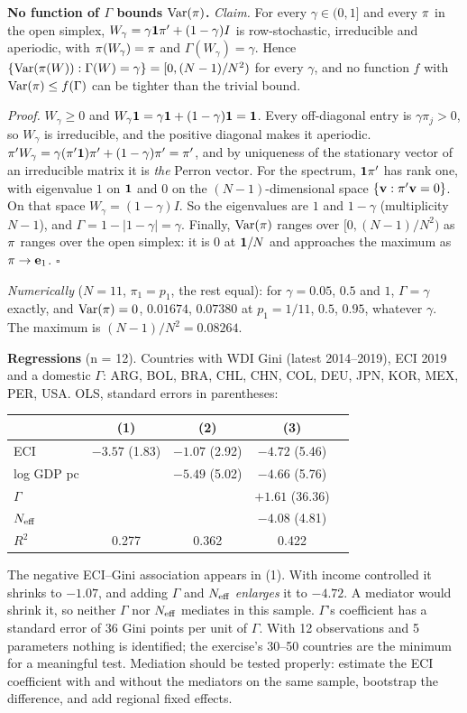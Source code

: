 \documentclass[../solutions_manual.tex]{subfiles}
\begin{document}
 \textbf{No function of $\Gamma$ bounds $\operatorname{Var}(\pi)$.} \emph{Claim.} For every $\gamma \in (0,1]$ and every $\pi$ in the open simplex, $W_\gamma = \gamma\mathbf{1}\pi' + (1-\gamma)I$ is row-stochastic, irreducible and aperiodic, with $\pi(W_\gamma) = \pi$ and $\Gamma(W_\gamma) = \gamma$. Hence $\{\operatorname{Var}(\pi(W)) : \Gamma(W) = \gamma\} = [0, (N-1)/N^2)$ for every $\gamma$, and no function $f$ with $\operatorname{Var}(\pi) \le f(\Gamma)$ can be tighter than the trivial bound.

\emph{Proof.} $W_\gamma \ge 0$ and $W_\gamma\mathbf{1} = \gamma\mathbf{1} + (1-\gamma)\mathbf{1} = \mathbf{1}$. Every off-diagonal entry is $\gamma\pi_j > 0$, so $W_\gamma$ is irreducible, and the positive diagonal makes it aperiodic. $\pi'W_\gamma = \gamma(\pi'\mathbf{1})\pi' + (1-\gamma)\pi' = \pi'$, and by uniqueness of the stationary vector of an irreducible matrix it is \emph{the} Perron vector. For the spectrum, $\mathbf{1}\pi'$ has rank one, with eigenvalue $1$ on $\mathbf{1}$ and $0$ on the $(N-1)$-dimensional space $\{\mathbf{v}: \pi'\mathbf{v} = 0\}$. On that space $W_\gamma = (1-\gamma)I$. So the eigenvalues are $1$ and $1-\gamma$ (multiplicity $N-1$), and $\Gamma = 1 - |1-\gamma| = \gamma$. Finally, $\operatorname{Var}(\pi)$ ranges over $[0, (N-1)/N^2)$ as $\pi$ ranges over the open simplex: it is $0$ at $\mathbf{1}/N$ and approaches the maximum as $\pi \to \mathbf{e}_1$. $\square$

\emph{Numerically} ($N = 11$, $\pi_1 = p_1$, the rest equal): for $\gamma = 0.05$, $0.5$ and $1$, $\Gamma = \gamma$ exactly, and $\operatorname{Var}(\pi) = 0$, $0.01674$, $0.07380$ at $p_1 = 1/11$, $0.5$, $0.95$, whatever $\gamma$. The maximum is $(N-1)/N^2 = 0.08264$.

 \textbf{Regressions} (n = 12). Countries with WDI Gini (latest 2014--2019), ECI 2019 and a domestic $\Gamma$: ARG, BOL, BRA, CHL, CHN, COL, DEU, JPN, KOR, MEX, PER, USA. OLS, standard errors in parentheses:
\begin{center}
\begin{tabular}{lcccc}
\toprule
& (1) & (2) & (3) \\
\midrule
ECI & $-3.57$ (1.83) & $-1.07$ (2.92) & $-4.72$ (5.46) \\
log GDP pc & & $-5.49$ (5.02) & $-4.66$ (5.76) \\
$\Gamma$ & & & $+1.61$ (36.36) \\
$N_{\text{eff}}$ & & & $-4.08$ (4.81) \\
$R^2$ & 0.277 & 0.362 & 0.422 \\
\bottomrule
\end{tabular}
\end{center}
The negative ECI--Gini association appears in (1). With income controlled it shrinks to $-1.07$, and adding $\Gamma$ and $N_{\text{eff}}$ \emph{enlarges} it to $-4.72$. A mediator would shrink it, so neither $\Gamma$ nor $N_{\text{eff}}$ mediates in this sample. $\Gamma$'s coefficient has a standard error of $36$ Gini points per unit of $\Gamma$. With 12 observations and 5 parameters nothing is identified; the exercise's 30--50 countries are the minimum for a meaningful test. Mediation should be tested properly: estimate the ECI coefficient with and without the mediators on the same sample, bootstrap the difference, and add regional fixed effects.
\end{document}
